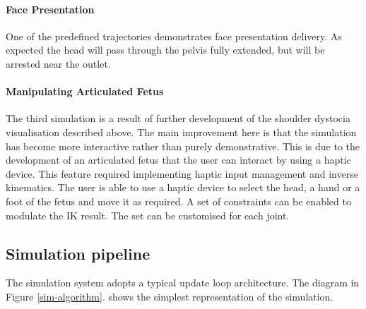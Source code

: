 \paragraph{Face Presentation}
One of the predefined trajectories demonstrates face presentation delivery. As expected the head will pass through the pelvis fully extended, but will be arrested near the outlet.

\paragraph{Manipulating Articulated Fetus}
The third simulation is a result of further development of the shoulder dystocia visualisation described above. The main improvement here is that the simulation has become more interactive rather than purely demonstrative. This is due to the development of an articulated fetus that the user can interact by using a haptic device. This feature required implementing haptic input management and inverse kinematics. The user is able to use a haptic device to select the head, a hand or a foot of the fetus and move it as required. A set of constraints can be enabled to modulate the IK result. The set can be customised for each joint.

\subsection{Simulation pipeline}

The simulation system adopts a typical update loop architecture. The diagram in Figure \ref{sim-algorithm}. shows the simplest representation of the simulation.

